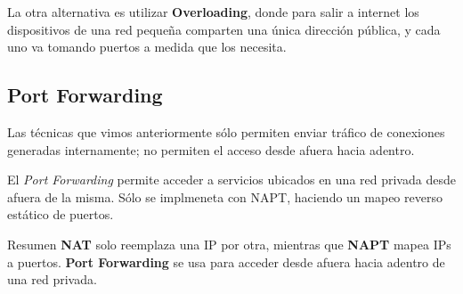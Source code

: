 La otra alternativa es utilizar \textbf{Overloading}, donde para salir a internet los dispositivos de una red pequeña comparten una única dirección pública, y cada uno va tomando puertos a medida que los necesita. 

\subsection{Port Forwarding}

Las técnicas que vimos anteriormente sólo permiten enviar tráfico de conexiones generadas internamente; no permiten el acceso desde afuera hacia adentro. 

El \emph{Port Forwarding} permite acceder a servicios ubicados en una red privada desde afuera de la misma. Sólo se implmeneta con NAPT, haciendo un mapeo reverso estático de puertos. 

\begin{definicion}{Resumen}
    \textbf{NAT} solo reemplaza una IP por otra, mientras que \textbf{NAPT} mapea IPs a puertos. \textbf{Port Forwarding} se usa para acceder desde afuera hacia adentro de una red privada. 
\end{definicion}
